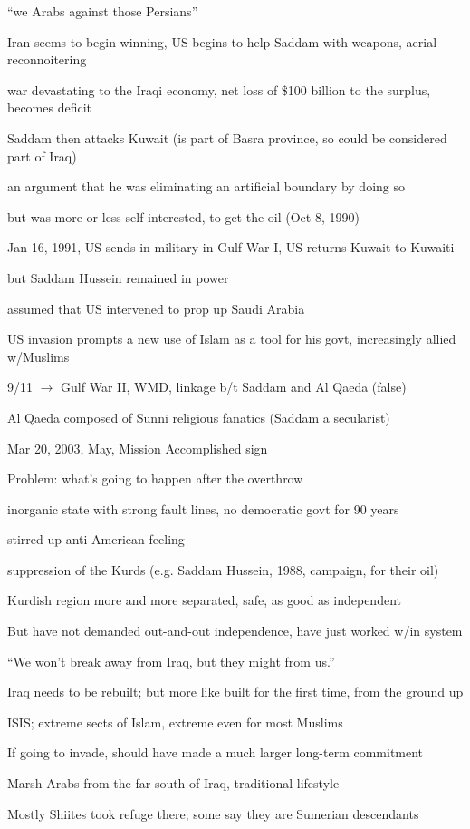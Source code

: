 \documentclass[12pt]{article}
\begin{document}
``we Arabs against those Persians''

Iran seems to begin winning, US begins to help Saddam with weapons, aerial reconnoitering

war devastating to the Iraqi economy, net loss of \$100 billion to the surplus, becomes deficit

Saddam then attacks Kuwait (is part of Basra province, so could be considered part of Iraq)

an argument that he was eliminating an artificial boundary by doing so

but was more or less self-interested, to get the oil (Oct 8, 1990)

Jan 16, 1991, US sends in military in Gulf War I, US returns Kuwait to Kuwaiti

but Saddam Hussein remained in power

assumed that US intervened to prop up Saudi Arabia

US invasion prompts a new use of Islam as a tool for his govt, increasingly allied w/Muslims

9/11 $\to$ Gulf War II, WMD, linkage b/t Saddam and Al Qaeda (false)

Al Qaeda composed of Sunni religious fanatics (Saddam a secularist)

Mar 20, 2003, May, Mission Accomplished sign

Problem: what's going to happen after the overthrow

inorganic state with strong fault lines, no democratic govt for 90 years

stirred up anti-American feeling

suppression of the Kurds (e.g. Saddam Hussein, 1988, campaign, for their oil)

Kurdish region more and more separated, safe, as good as independent

But have not demanded out-and-out independence, have just worked w/in system

``We won't break away from Iraq, but they might from us.''

Iraq needs to be rebuilt; but more like built for the first time, from the ground up

ISIS; extreme sects of Islam, extreme even for most Muslims

If going to invade, should have made a much larger long-term commitment

Marsh Arabs from the far south of Iraq, traditional lifestyle

Mostly Shiites took refuge there; some say they are Sumerian descendants
\end{document}
